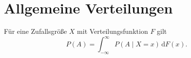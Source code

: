 \section{Allgemeine Verteilungen}

\noindent{}
Für eine Zufallsgröße $X$ mit Verteilungsfunktion $F$ gilt
\begin{equation}
P(A) = \int_{-\infty}^\infty P(A\mid X=x)\,\mathrm dF(x).
\end{equation}
